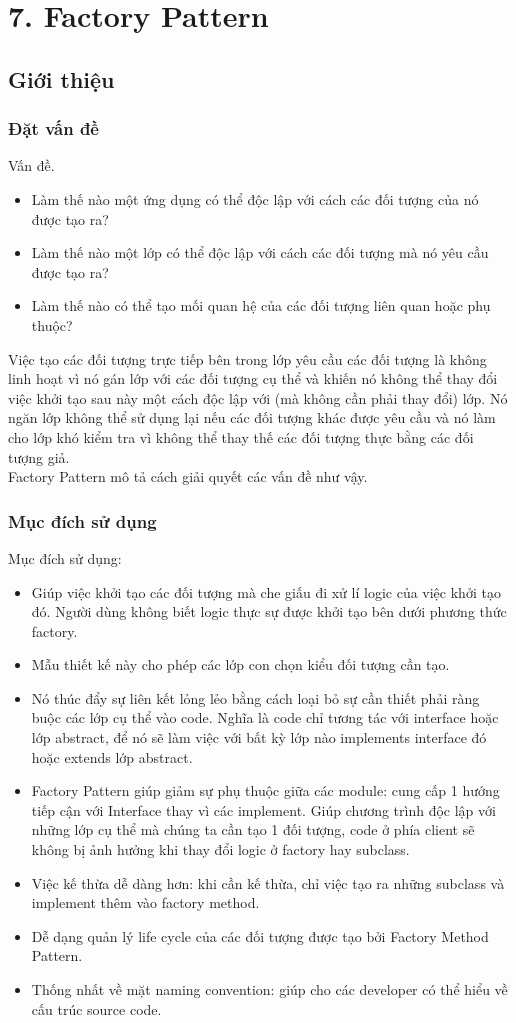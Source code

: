 \chapter{7. Factory Pattern}
\section{Giới thiệu}
\subsection{Đặt vấn đề}
Vấn đề.
\begin{itemize}
    \item Làm thế nào một ứng dụng có thể độc lập với cách các đối tượng của nó được tạo ra?
    \item Làm thế nào một lớp có thể độc lập với cách các đối tượng mà nó yêu cầu được tạo ra?
    \item Làm thế nào có thể tạo mối quan hệ của các đối tượng liên quan hoặc phụ thuộc?
\end{itemize}
Việc tạo các đối tượng trực tiếp bên trong lớp yêu cầu các đối tượng là không linh hoạt vì nó gán lớp với các đối tượng cụ thể và khiến nó không thể thay đổi việc khởi tạo sau này một cách độc lập với (mà không cần phải thay đổi) lớp. Nó ngăn lớp không thể sử dụng lại nếu các đối tượng khác được yêu cầu và nó làm cho lớp khó kiểm tra vì không thể thay thế các đối tượng thực bằng các đối tượng giả.\\
Factory Pattern mô tả cách giải quyết các vấn đề như vậy.

\subsection{Mục đích sử dụng}
Mục đích sử dụng:
\begin{itemize}
    \item Giúp việc khởi tạo các đối tượng mà che giấu đi xử lí logic của việc khởi tạo đó. Người dùng không biết logic thực sự được khởi tạo bên dưới phương thức factory.
    \item Mẫu thiết kế này cho phép các lớp con chọn kiểu đối tượng cần tạo.
    \item Nó thúc đẩy sự liên kết lỏng lẻo bằng cách loại bỏ sự cần thiết phải ràng buộc các lớp cụ thể vào code. Nghĩa là code chỉ tương tác với interface hoặc lớp abstract, để nó sẽ làm việc với bất kỳ lớp nào implements interface đó hoặc extends lớp abstract.
    \item Factory Pattern giúp giảm sự phụ thuộc giữa các module: cung cấp 1 hướng tiếp cận với Interface thay vì các implement. Giúp chương trình độc lập với những lớp cụ thể mà chúng ta cần tạo 1 đối tượng, code ở phía client sẽ không bị ảnh hưởng khi thay đổi logic ở factory hay subclass.
    \item Việc kế thừa dễ dàng hơn: khi cần kế thừa, chỉ việc tạo ra những subclass và implement thêm vào factory method.
    \item Dễ dạng quản lý life cycle của các đối tượng được tạo bởi Factory Method Pattern.
    \item Thống nhất về mặt naming convention: giúp cho các developer có thể hiểu về cấu trúc source code.
\end{itemize}

